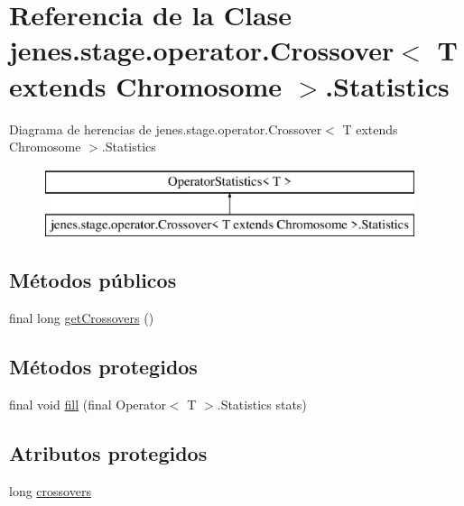\hypertarget{classjenes_1_1stage_1_1operator_1_1_crossover_3_01_t_01extends_01_chromosome_01_4_1_1_statistics}{\section{Referencia de la Clase jenes.\-stage.\-operator.\-Crossover$<$ T extends Chromosome $>$.Statistics}
\label{classjenes_1_1stage_1_1operator_1_1_crossover_3_01_t_01extends_01_chromosome_01_4_1_1_statistics}
}
Diagrama de herencias de jenes.\-stage.\-operator.\-Crossover$<$ T extends Chromosome $>$.Statistics\begin{figure}[H]
\begin{center}
\leavevmode
\includegraphics[height=2.000000cm]{classjenes_1_1stage_1_1operator_1_1_crossover_3_01_t_01extends_01_chromosome_01_4_1_1_statistics}
\end{center}
\end{figure}
\subsection*{Métodos públicos}
\begin{DoxyCompactItemize}
\item 
final long \hyperlink{classjenes_1_1stage_1_1operator_1_1_crossover_3_01_t_01extends_01_chromosome_01_4_1_1_statistics_a6181ee46b3e760f5d440e758d95db04b}{get\-Crossovers} ()
\end{DoxyCompactItemize}
\subsection*{Métodos protegidos}
\begin{DoxyCompactItemize}
\item 
final void \hyperlink{classjenes_1_1stage_1_1operator_1_1_crossover_3_01_t_01extends_01_chromosome_01_4_1_1_statistics_ae352590e85b1d1d821b0912a770f257a}{fill} (final Operator$<$ T $>$.Statistics stats)
\end{DoxyCompactItemize}
\subsection*{Atributos protegidos}
\begin{DoxyCompactItemize}
\item 
long \hyperlink{classjenes_1_1stage_1_1operator_1_1_crossover_3_01_t_01extends_01_chromosome_01_4_1_1_statistics_abf1983cc628b3283b942dc68cc871bbc}{crossovers}
\end{DoxyCompactItemize}


